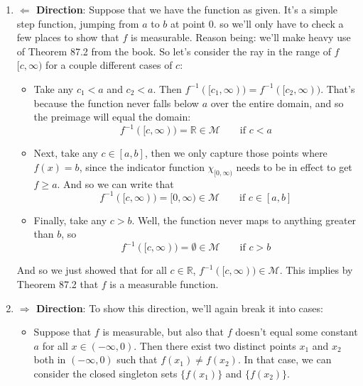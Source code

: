 \documentclass[12pt]{article}
\theoremstyle{plain}
\theoremstyle{definition}
\theoremstyle{remark}
\begin{document}
\begin{enumerate}
\begin{enumerate}
    \item \textbf{$\Leftarrow$ Direction}: Suppose that we have the function as given.  It's a simple step function, jumping from $a$ to $b$ at point $0$. so we'll only have to check a few places to show that $f$ is measurable. Reason being: we'll make heavy use of Theorem 87.2 from the book. So let's consider the ray in the range of $f$ $[c,\infty)$ for a couple different cases of $c$:
\begin{itemize}
\item Take any $c_1<a$ and $c_2<a$. Then $f^{-1}([c_1,\infty)) =f^{-1}([c_2,\infty))$. That's because the function never falls below $a$ over the entire domain, and so the preimage will equal the domain:
\[
    f^{-1}([c,\infty)) = \mathbb{R}\in\mathscr{M} \qquad 
        \text{if $c<a$}
\]
\item Next, take any $c \in [a,b]$, then we only capture those points where $f(x)=b$, since the indicator function $\chi_{[0,\infty)}$ needs to be in effect to get $f\geq a$. And so we can write that
\[
    f^{-1}([c,\infty)) = [0,\infty)\in\mathscr{M} \qquad 
        \text{if $c\in[a,b]$}
\]
\item Finally, take any $c >b$. Well, the function never maps to anything greater than $b$, so
\[
    f^{-1}([c,\infty)) = \emptyset\in\mathscr{M} \qquad 
        \text{if $c>b$}
\]
\end{itemize}
And so we just showed that for all $c\in\mathbb{R}$, $f^{-1}([c,\infty))\in\mathscr{M}$. This implies by Theorem 87.2 that $f$ is a measurable function.

\item \textbf{$\Rightarrow$ Direction}: To show this direction, we'll again break it into cases:
\begin{itemize}
    \item Suppose that $f$ is measurable, but also that $f$ doesn't equal some constant $a$ for all $x\in(-\infty,0)$. Then there exist two distinct points $x_1$ and $x_2$ both in $(-\infty,0)$ such that $f(x_1)\neq f(x_2)$. In that case, we can consider the closed singleton sets $\{f(x_1)\}$ and $\{f(x_2)\}$. 


\end{itemize}
\end{enumerate}
\end{enumerate}
\end{document}

